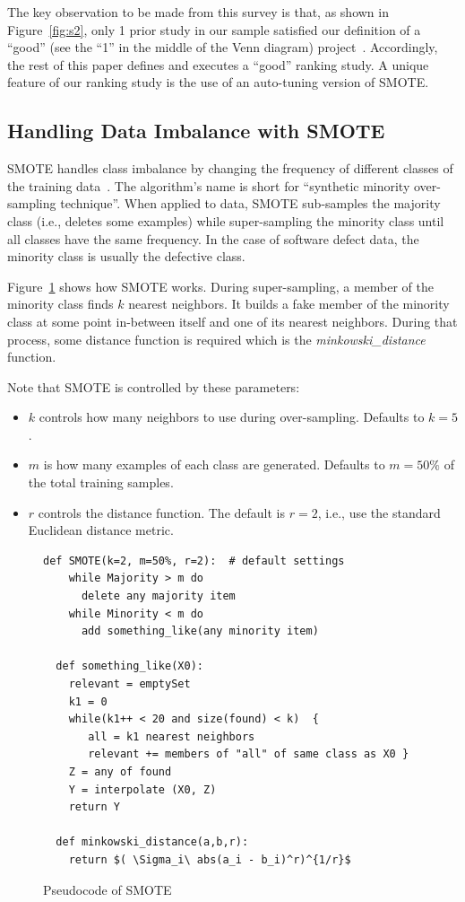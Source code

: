 \documentclass[sigconf,review, anonymous]{acmart}
\newcommand{\bi}{\begin{itemize}[leftmargin=0.4cm]}
\newcommand{\ei}{\end{itemize}}
\theoremstyle{break}
\theoremstyle{break}
\begin{document}
The key observation to be made from  this 
survey is that, as shown in Figure~\ref{fig:s2}, only 1 prior study in our sample satisfied  our definition of a ``good'' (see the ``1'' in the middle of the Venn diagram) project~\cite{bennin2017mahakil}. 
Accordingly, the rest of this
paper defines and executes a ``good'' ranking  study. A unique feature of our
ranking study is the use of an auto-tuning version of SMOTE.

\subsection{Handling Data Imbalance with SMOTE}
\label{sect:smote}

SMOTE handles class imbalance by changing the frequency of different classes of the training
data~\cite{chawla2002smote}. 
The algorithm's name is short for ``synthetic minority over-sampling technique''.
When applied to data, SMOTE sub-samples the majority class (i.e., deletes some examples)
while super-sampling the minority class
until
all classes have the same frequency.  In the case of software defect data,
the minority class is usually the  defective class.



Figure~\ref{fig:pseudocode} shows how SMOTE works. During super-sampling,
a member of the minority class finds $k$ nearest neighbors. It builds a fake member
of the minority class at some point in-between itself and one of its nearest
neighbors.  During that process, some distance function is required which is the {\em minkowski\_distance} function. 

\noindent
Note that SMOTE is controlled by these  parameters:
\bi
\item $k$ controls how many neighbors to use during over-sampling. Defaults to $k=5$.
\item $m$ is how many examples of each class are generated. Defaults to $m=50\%$ of the total training samples.
\item $r$ controls the distance function. The default is $r=2$,
i.e., use the  
standard Euclidean distance metric.
\vspace{-0.3cm}
\ei

 \begin{figure}[!h]
\begin{lstlisting}[mathescape,linewidth=8.0cm,frame=r,numbers=right]
  def SMOTE(k=2, m=50%, r=2):  # default settings
    while Majority > m do
      delete any majority item
    while Minority < m do
      add something_like(any minority item)
      
  def something_like(X0): 
    relevant = emptySet
    k1 = 0
    while(k1++ < 20 and size(found) < k)  {
       all = k1 nearest neighbors
       relevant += members of "all" of same class as X0 }
    Z = any of found
    Y = interpolate (X0, Z)
    return Y
    
  def minkowski_distance(a,b,r): 
    return $( \Sigma_i\ abs(a_i - b_i)^r)^{1/r}$
\end{lstlisting}
\vspace{-0.3cm}
\caption{Pseudocode of SMOTE}
\label{fig:pseudocode}  
\vspace{-0.3cm}
\end{figure}
\end{document}
